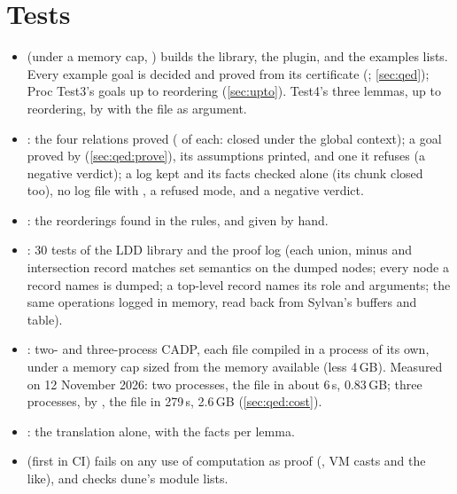 \section{Tests}\label{sec:tests}

\begin{itemize}
\item {} (under a memory cap, ) builds
  the library, the plugin,  and the examples
   lists. Every example goal is decided and proved
  from its certificate (; \cref{sec:qed}); Proc Test3's goals
  up to reordering (\cref{sec:upto}). Test4's three lemmas, up to
  reordering, by  with the file as argument.
\item {}: the four relations proved
  ( of each: closed under the global context);
  a goal proved by  (\cref{sec:qed:prove}), its
  assumptions printed, and one it refuses (a negative verdict); a
  log kept and its facts checked alone (its chunk closed too), no log
  file with , a refused mode, and a negative verdict.
\item {}: the reorderings found in the rules,
  and given by hand.
\item {}: 30 tests of the LDD library and
  the proof log (each union, minus and intersection record matches set
  semantics on the dumped nodes; every node a record names is dumped; a
  top-level record names its role and arguments; the same operations
  logged in memory, read back from Sylvan's buffers and table).
\item {}: two- and three-process CADP, each file
  compiled in a process of its own, under a memory cap sized from the
  memory available (less 4\,GB). Measured on 12 November 2026: two
  processes, the file in about 6\,s, 0.83\,GB; three processes, by
  , the file in 279\,s, 2.6\,GB
  (\cref{sec:qed:cost}).
\item {}: the translation alone, with
  the facts per lemma.
\item {} (first in CI) fails on any
  use of computation as proof (, VM casts and the like),
  and  checks dune's module lists.
\end{itemize}
